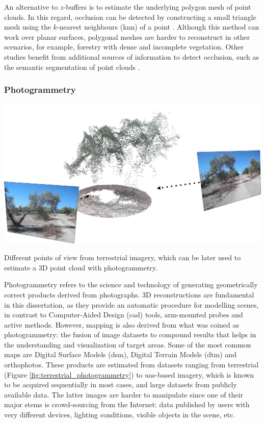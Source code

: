 An alternative to $z$-buffers is to estimate the underlying polygon mesh of point clouds. In this regard, occlusion can be detected by constructing a small triangle mesh using the $k$-nearest neighbours (\acrshort{knn}) of a point \cite{jurado_multispectral_2020}. Although this method can work over planar surfaces, polygonal meshes are harder to reconstruct in other scenarios, for example, forestry with dense and incomplete vegetation. Other studies benefit from additional sources of information to detect occlusion, such as the semantic segmentation of point clouds \cite{schneider_fusing_2010}. 

\subsubsection{Photogrammetry}

\begin{marginfigure}[2.0cm]
	\includegraphics{figs/fundamentals/terrestrial_photogrammetry.png}
	\caption{Different points of view from terrestrial imagery, which can be later used to estimate a 3D point cloud with photogrammetry.}
	\label{fig:terrestrial_photogrammetry}
\end{marginfigure}
Photogrammetry refers to the science and technology of generating geometrically correct products derived from photographs. 3D reconstructions are fundamental in this dissertation, as they provide an automatic procedure for modelling scenes, in contrast to Computer-Aided Design (\acrshort{cad}) tools, arm-mounted probes and active methods. However, mapping is also derived from what was coined as photogrammetry: the fusion of image datasets to compound results that helps in the understanding and visualization of target areas. Some of the most common maps are Digital Surface Models (\acrshort{dsm}), Digital Terrain Models (\acrshort{dtm}) and orthophotos. These products are estimated from datasets ranging from terrestrial (Figure \ref{fig:terrestrial_photogrammetry}) to \acrshort{uas}-based imagery, which is known to be acquired sequentially in most cases, and large datasets from publicly available data. The latter images are harder to manipulate since one of their major stems is crowd-sourcing from the Internet: data published by users with very different devices, lighting conditions, visible objects in the scene, etc.


